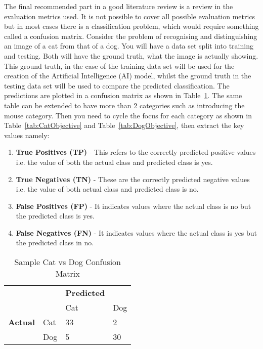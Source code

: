 \par The final recommended part in a good literature review is a review in the evaluation metrics used. It is not possible to cover all possible evaluation metrics but in most cases there is a classification problem, which would require something called a confusion matrix. Consider the problem of recognising and distinguishing an image of a cat from that of a dog. You will have a data set split into training and testing. Both will have the ground truth, what the image is actually showing. This ground truth, in the case of the training data set will be used for the creation of the Artificial Intelligence (AI) model, whilst the ground truth in the testing data set will be used to compare the predicted classification. The predictions are plotted in a confusion matrix as shown in Table~\ref{tab:CatDog}. The same table can be extended to have more than 2 categories such as introducing the mouse category. Then you need to cycle the focus for each category as shown in Table~\ref{tab:CatObjective} and Table~\ref{tab:DogObjective}, then extract the key values namely:
\begin{enumerate}
    \item \textbf{True Positives (TP)} - This refers to the correctly predicted positive values i.e. the value of both the actual class and predicted class is yes. 
    \item \textbf{True Negatives (TN)} - These are the correctly predicted negative values i.e. the value of both actual class and predicted class is no.
    \item \textbf{False Positives (FP)} - It indicates values where the actual class is no but the predicted class is yes.
    \item \textbf{False Negatives (FN)} - It indicates values where the actual class is yes but the predicted class in no.
\end{enumerate}

\begin{table}
    \caption{Sample Cat vs Dog Confusion Matrix}
    \label{tab:CatDog}
    \centering
    \begin{tabular}{ll|ll}
    ~      & ~   & \textbf{Predicted} & ~   \\
    ~      & ~   & Cat       & Dog \\ \hline
    \textbf{Actual} & Cat & 33        & 2   \\
    ~      & Dog & 5         & 30  \\
    \end{tabular}
\end{table}

